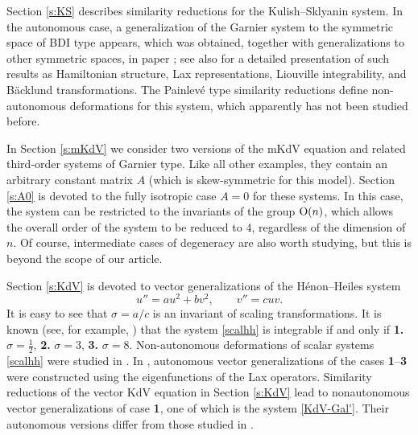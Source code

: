 \documentclass[11pt]{article}
\theoremstyle{plain}
\theoremstyle{definition}
\begin{document}
Section \ref{s:KS} describes similarity reductions for the Kulish--Sklyanin system. In the autonomous case, a generalization of the Garnier system to the symmetric space of BDI type appears, which was obtained, together with generalizations to other symmetric spaces, in paper \cite{Fordy_Wojciechoski_Marshall_1986}; see also \cite[Chapter 25]{Suris_2003} for a detailed presentation of such results as Hamiltonian structure, Lax representations, Liouville integrability, and B\"acklund transformations. The Painlev\'e type similarity reductions define non-autonomous deformations for this system, which apparently has not been studied before.

In Section \ref{s:mKdV} we consider two versions of the mKdV equation and related third-order systems of Garnier type. Like all other examples, they contain an arbitrary constant matrix $A$ (which is skew-symmetric for this model). Section \ref{s:A0} is devoted to the fully isotropic case $A=0$ for these systems. In this case, the system can be restricted to the invariants of the group ${\rm O}(n)$, which allows the overall order of the system to be reduced to 4, regardless of the dimension of $n$. Of course, intermediate cases of degeneracy are also worth studying, but this is beyond the scope of our article.

Section \ref{s:KdV} is devoted to vector generalizations of the H\'enon--Heiles system
\begin{equation}\label{scalhh}
u''= a u^2+b v^2, \qquad v''= c u v.
\end{equation}
It is easy to see that $\sigma=a/c$ is an invariant of scaling transformations. It is known (see, for example, \cite{ConteMusette}) that the system \eqref{scalhh} is integrable if and only if {\bf 1.} $\sigma =\frac{1}{2}$, {\bf 2.} $\sigma=3$, {\bf 3.} $\sigma= 8$. Non-autonomous deformations of scalar systems \eqref{scalhh} were studied in \cite{Hone_1998}. In \cite{Antonowicz_Rauch-Wojciechowski_1992}, autonomous vector generalizations of the cases {\bf 1}--{\bf 3} were constructed using the eigenfunctions of the Lax operators. Similarity reductions of the vector KdV equation in Section \ref{s:KdV} lead to nonautonomous vector generalizations of case {\bf 1}, one of which is the system \eqref{KdV-Gal'}. Their autonomous versions differ from those studied in \cite{Antonowicz_Rauch-Wojciechowski_1992, Suris_2003}.
\end{document}
